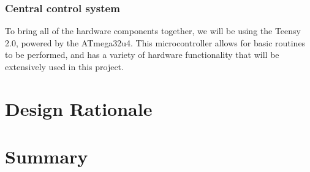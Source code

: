 \documentclass[draftclsnofoot,onecolumn,letterpaper,10pt]{IEEEtran}
\begin{document}
\subsubsection{Central control system}
To bring all of the hardware components together, we will be using the Teensy 2.0, powered by the ATmega32u4. This microcontroller allows for basic
routines to be performed, and has a variety of hardware functionality that will be extensively used in this project.

\section{Design Rationale}

\section{Summary}



\end{document}

